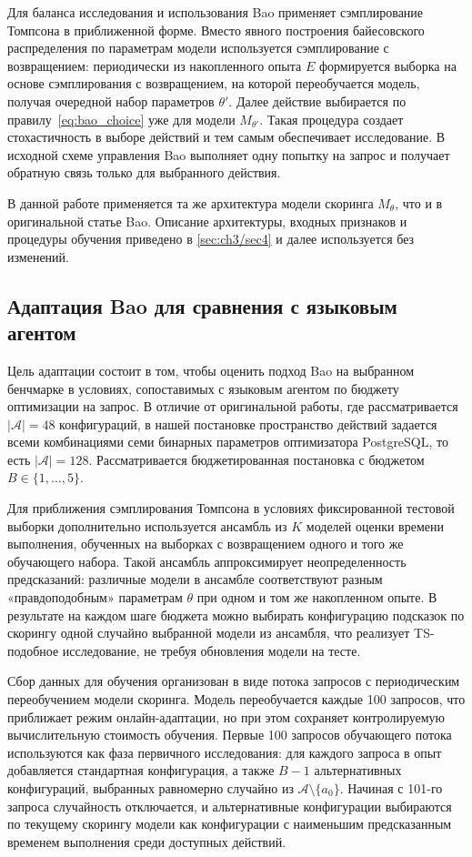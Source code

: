 Для баланса исследования и использования Bao применяет сэмплирование Томпсона в приближенной форме. Вместо явного построения байесовского распределения по параметрам модели используется сэмплирование с возвращением: периодически из накопленного опыта $E$ формируется выборка на основе сэмплирования с возвращением, на которой переобучается модель, получая очередной набор параметров $\theta'$. Далее действие выбирается по правилу~\cref{eq:bao_choice} уже для модели $M_{\theta'}$. Такая процедура создает стохастичность в выборе действий и тем самым обеспечивает исследование. В исходной схеме управления Bao выполняет одну попытку на запрос и получает обратную связь только для выбранного действия.

В данной работе применяется та же архитектура модели скоринга $M_\theta$, что и в оригинальной статье Bao. Описание архитектуры, входных признаков и процедуры обучения приведено в \cref{sec:ch3/sec4} и далее используется без изменений.

\subsection{Адаптация Bao для сравнения с языковым агентом}\label{subsec:bao_adaptation}
Цель адаптации состоит в том, чтобы оценить подход Bao на выбранном бенчмарке в условиях, сопоставимых с языковым агентом по бюджету оптимизации на запрос. В отличие от оригинальной работы, где рассматривается $|\mathcal{A}|=48$ конфигураций, в нашей постановке пространство действий задается всеми комбинациями семи бинарных параметров оптимизатора PostgreSQL, то есть $|\mathcal{A}|=128$. Рассматривается бюджетированная постановка с бюджетом $B\in\{1,\dots,5\}$.

Для приближения сэмплирования Томпсона в условиях фиксированной тестовой выборки дополнительно используется ансамбль из $K$ моделей оценки времени выполнения, обученных на выборках с возвращением одного и того же обучающего набора. Такой ансамбль аппроксимирует неопределенность предсказаний: различные модели в ансамбле соответствуют разным «правдоподобным» параметрам $\theta$ при одном и том же накопленном опыте. В результате на каждом шаге бюджета можно выбирать конфигурацию подсказок по скорингу одной случайно выбранной модели из ансамбля, что реализует TS-подобное исследование, не требуя обновления модели на тесте.

Сбор данных для обучения организован в виде потока запросов с периодическим переобучением модели скоринга. Модель переобучается каждые 100 запросов, что приближает режим онлайн-адаптации, но при этом сохраняет контролируемую вычислительную стоимость обучения. Первые 100 запросов обучающего потока используются как фаза первичного исследования: для каждого запроса в опыт добавляется стандартная конфигурация, а также $B-1$ альтернативных конфигураций, выбранных равномерно случайно из $\mathcal{A}\setminus\{a_0\}$. Начиная с 101-го запроса случайность отключается, и альтернативные конфигурации выбираются по текущему скорингу модели как конфигурации с наименьшим предсказанным временем выполнения среди доступных действий.

